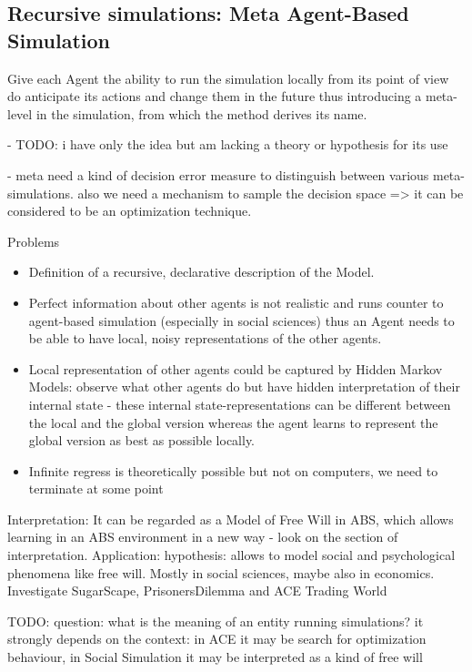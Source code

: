\subsection{Recursive simulations: Meta Agent-Based Simulation}
Give each  Agent the ability to run the simulation locally from its point of view do anticipate its actions and change them in the future thus introducing a meta-level in the simulation, from which the method derives its name.

- TODO:  i have only the idea but am lacking a theory or hypothesis for its use

- meta need a kind of decision error measure to distinguish between various meta-simulations. also we need a mechanism to sample the decision space => it can be considered to be an optimization technique.

Problems
\begin{itemize}
	\item Definition of a recursive, declarative description of the Model.
	\item Perfect information about other agents is not realistic and runs counter to agent-based simulation (especially in social sciences) thus an Agent needs to be able to have local, noisy representations of the other agents.
	\item Local representation of other agents could be captured by Hidden Markov Models: observe what other agents do but have hidden interpretation of their internal state - these internal state-representations can be different between the local and the global version whereas the agent learns to represent the global version as best as possible locally.
	\item Infinite regress is theoretically possible but not on computers, we need to terminate at some point
\end{itemize}

Interpretation: It can be regarded as a Model of Free Will in ABS, which allows learning in an ABS environment in a new way - look on the section of interpretation.
Application: hypothesis: allows to model social and psychological phenomena like free will. Mostly in social sciences, maybe also in economics. Investigate SugarScape, PrisonersDilemma and ACE Trading World

TODO: question: what is the meaning of an entity running simulations? it strongly depends on the context: in ACE it may be search for optimization behaviour, in Social Simulation it may be interpreted as a kind of free will

